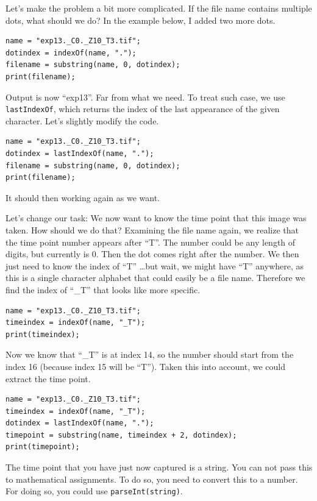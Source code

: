 \documentclass[11pt,a4paper,oneside]{report}
\newcommand{\ilcom}[1]{\texttt{\small#1}}
\begin{document}
Let's make the problem a bit more complicated. If the file name contains multiple dots, what should we do? In the example below, I added two more dots. 

\begin{lstlisting}
name = "exp13._C0._Z10_T3.tif";
dotindex = indexOf(name, ".");
filename = substring(name, 0, dotindex);
print(filename);
\end{lstlisting}

Output is now ``exp13''. Far from what we need. To treat such case, we use \ilcom{lastIndexOf}, which returns the index of the last appearance of the given character. Let's slightly modify the code. 

\begin{lstlisting}
name = "exp13._C0._Z10_T3.tif";
dotindex = lastIndexOf(name, ".");
filename = substring(name, 0, dotindex);
print(filename);
\end{lstlisting}

It should then working again as we want. 

Let's change our task: We now want to know the time point that this image was taken. How should we do that? Examining the file name again, we realize that the time point number appears after ``T''. The number could be any length of digits, but currently is 0. Then the dot comes right after the number. We then just need to know the index of ``T'' \ldots but wait, we might have ``T'' anywhere, as this is a single character alphabet that could easily be a file name. Therefore we find the index of ``\_T'' that looks like more specific. 

\begin{lstlisting}
name = "exp13._C0._Z10_T3.tif";
timeindex = indexOf(name, "_T");
print(timeindex);
\end{lstlisting}

Now we know that ``\_T'' is at index 14, so the number should start from the index 16 (because index 15 will be ``T''). Taken this into account, we could extract the time point. 

\begin{lstlisting}
name = "exp13._C0._Z10_T3.tif";
timeindex = indexOf(name, "_T");
dotindex = lastIndexOf(name, ".");
timepoint = substring(name, timeindex + 2, dotindex);
print(timepoint);
\end{lstlisting}

The time point that you have just now captured is a string. You can not pass this to mathematical assignments. To do so, you need to convert this to a number. For doing so, you could use \ilcom{parseInt(string)}. 
\end{document}
